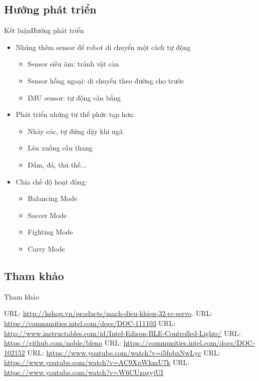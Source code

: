 \documentclass[compress, blue, 13pt,hyperref={pdfpagemode=FullScreen}]{beamer}
\begin{document}
\subsection{Hướng phát triển}
\begin{frame}{Kết luận}{Hướng phát triển}
\begin{itemize}
\item Nhúng thêm sensor để robot di chuyển một cách tự động
\begin{itemize}
\item Sensor siêu âm: tránh vật cản
\item Sensor hồng ngoại: di chuyển theo đường cho trước
\item IMU sensor: tự động cân bằng
\end{itemize}
\item Phát triển những tư thế phức tạp hơn:
\begin{itemize}
\item Nhảy cóc, tự đứng dậy khi ngã
\item Lên xuống cầu thang
\item Đấm, đá, thủ thế...
\end{itemize}
\item Chia chế độ hoạt động:
\begin{itemize}
\item Balancing Mode
\item Soccer Mode
\item Fighting Mode
\item Carry Mode
\end{itemize}
\end{itemize}
\end{frame}
\subsection{Tham khảo}
\begin{frame}{Tham khảo}
\begin{thebibliography}{39}
URL: \url{http://hshop.vn/products/mach-dieu-khien-32-rc-servo}.
URL: \url{https://communities.intel.com/docs/DOC-111103}
URL: \url{http://www.instructables.com/id/Intel-Edison-BLE-Controlled-Lights/}
URL: \url{https://github.com/noble/bleno}
URL: 
\url{https://communities.intel.com/docs/DOC-102152}
URL: \url{https://www.youtube.com/watch?v=i5fpbxNwLyc}
URL: \url{https://www.youtube.com/watch?v=AC9XpWkmU7k}
URL: \url{https://www.youtube.com/watch?v=W6CUzogyjUI}
\end{thebibliography}
\end{frame}
\section*{}
\begin{frame}
\transdissolve
\begin{center}
\begin{Huge}
\color{blue}{Cảm ơn các thầy/cô đã lắng nghe}
\end{Huge}
\end{center}
\end{frame}
\end{document}
